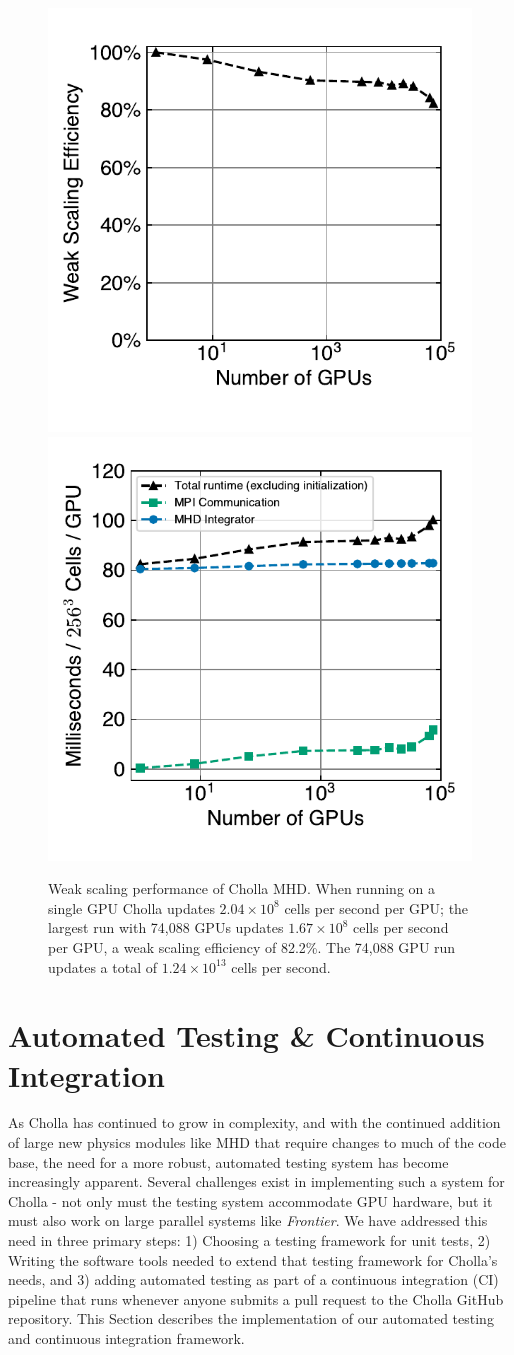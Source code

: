 \documentclass[modern, linenumbers]{aastex631}
\newcommand*{\img}[1]{%
    \raisebox{-.3\baselineskip}{%
        \texttt{[image: \#1]}%
    }%
}
\begin{document}
\begin{figure}[ht!]
    \includegraphics[width=0.5\linewidth]{scaling_tests_weak_efficiency.pdf}
    \includegraphics[width=0.5\linewidth]{scaling_tests_ms_per_gpu.pdf}
    \caption{Weak scaling performance of Cholla MHD. When running on a single GPU Cholla updates $2.04\times10^8$ cells per second per GPU; the largest run with 74,088 GPUs updates $1.67\times10^8$ cells per second per GPU, a weak scaling efficiency of 82.2\%. The 74,088 GPU run updates a total of $1.24\times10^{13}$ cells per second. \href{https://github.com/bcaddy/caddy-et-al-2023/blob/4612068c56b05fbb3286bb96228c65862a6e3c10/python/scaling_plots.py}{\img{github.png}}}
    \label{fig:scaling-weak-efficiency}
\end{figure}

\section{Automated Testing \& Continuous Integration}
\label{sec:testing}

As Cholla has continued to grow in complexity, and with the continued addition of large new physics modules like MHD that require changes to much of the code base, the need for a more robust, automated testing system has become increasingly apparent. Several challenges exist in implementing such a system for Cholla - not only must the testing system accommodate GPU hardware, but it must also work on large parallel systems like \textit{Frontier}. We have addressed this need in three primary steps: 1) Choosing a testing framework for unit tests, 2) Writing the software tools needed to extend that testing framework for Cholla's needs, and 3) adding automated testing as part of a continuous integration (CI) pipeline that runs whenever anyone submits a pull request to the Cholla GitHub repository. This Section describes the implementation of our automated testing and continuous integration framework.
\end{document}
